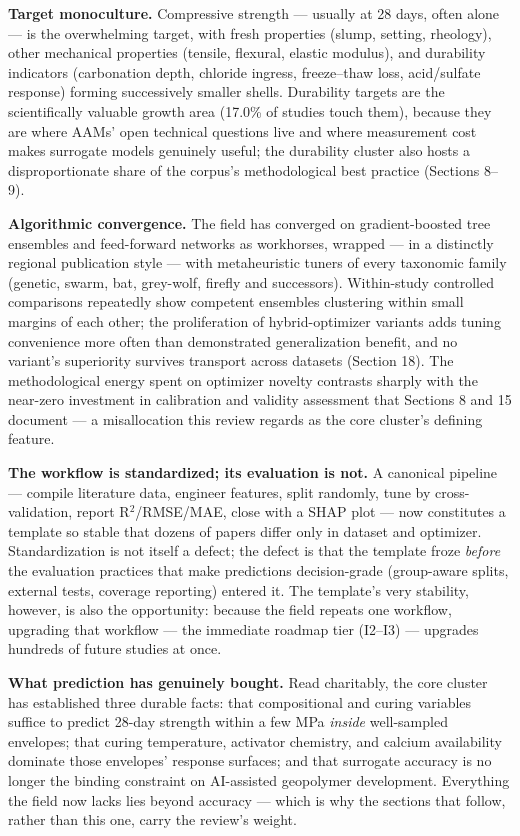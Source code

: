 \documentclass[pdflatex,sn-basic]{sn-jnl}
\begin{document}
\textbf{Target monoculture.} Compressive strength --- usually at 28 days, often alone --- is the overwhelming target, with fresh properties (slump, setting, rheology), other mechanical properties (tensile, flexural, elastic modulus), and durability indicators (carbonation depth, chloride ingress, freeze--thaw loss, acid/sulfate response) forming successively smaller shells. Durability targets are the scientifically valuable growth area (17.0\% of studies touch them), because they are where AAMs' open technical questions live and where measurement cost makes surrogate models genuinely useful; the durability cluster also hosts a disproportionate share of the corpus's methodological best practice (Sections 8--9).

\textbf{Algorithmic convergence.} The field has converged on gradient-boosted tree ensembles and feed-forward networks as workhorses, wrapped --- in a distinctly regional publication style --- with metaheuristic tuners of every taxonomic family (genetic, swarm, bat, grey-wolf, firefly and successors). Within-study controlled comparisons repeatedly show competent ensembles clustering within small margins of each other; the proliferation of hybrid-optimizer variants adds tuning convenience more often than demonstrated generalization benefit, and no variant's superiority survives transport across datasets (Section 18). The methodological energy spent on optimizer novelty contrasts sharply with the near-zero investment in calibration and validity assessment that Sections 8 and 15 document --- a misallocation this review regards as the core cluster's defining feature.

\textbf{The workflow is standardized; its evaluation is not.} A canonical pipeline --- compile literature data, engineer features, split randomly, tune by cross-validation, report R$^2$/RMSE/MAE, close with a SHAP plot --- now constitutes a template so stable that dozens of papers differ only in dataset and optimizer. Standardization is not itself a defect; the defect is that the template froze \emph{before} the evaluation practices that make predictions decision-grade (group-aware splits, external tests, coverage reporting) entered it. The template's very stability, however, is also the opportunity: because the field repeats one workflow, upgrading that workflow --- the immediate roadmap tier (I2--I3) --- upgrades hundreds of future studies at once.

\textbf{What prediction has genuinely bought.} Read charitably, the core cluster has established three durable facts: that compositional and curing variables suffice to predict 28-day strength within a few MPa \emph{inside} well-sampled envelopes; that curing temperature, activator chemistry, and calcium availability dominate those envelopes' response surfaces; and that surrogate accuracy is no longer the binding constraint on AI-assisted geopolymer development. Everything the field now lacks lies beyond accuracy --- which is why the sections that follow, rather than this one, carry the review's weight.
\end{document}
